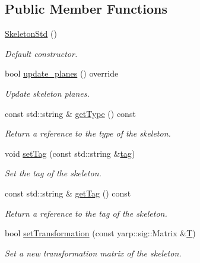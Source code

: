 \subsection*{Public Member Functions}
\begin{DoxyCompactItemize}
\item 
\mbox{\label{classassistive__rehab_1_1SkeletonStd_ae383ac2b515aa5774b010afc22856360}} 
\hyperlink{classassistive__rehab_1_1SkeletonStd_ae383ac2b515aa5774b010afc22856360}{Skeleton\+Std} ()
\begin{DoxyCompactList}\small\item\em Default constructor. \end{DoxyCompactList}\item 
bool \hyperlink{classassistive__rehab_1_1SkeletonStd_a5769bc6fd407118c866b57b869d672ca}{update\+\_\+planes} () override
\begin{DoxyCompactList}\small\item\em Update skeleton planes. \end{DoxyCompactList}\item 
const std\+::string \& \hyperlink{classassistive__rehab_1_1Skeleton_a4efc4844bd2b185f1080ee52ab69cb04}{get\+Type} () const
\begin{DoxyCompactList}\small\item\em Return a reference to the type of the skeleton. \end{DoxyCompactList}\item 
void \hyperlink{classassistive__rehab_1_1Skeleton_ae1c830e3d9a0ba692e5ae297caa52a82}{set\+Tag} (const std\+::string \&\hyperlink{classassistive__rehab_1_1Skeleton_a3d1ce5280300e012826948dc4383c2cb}{tag})
\begin{DoxyCompactList}\small\item\em Set the tag of the skeleton. \end{DoxyCompactList}\item 
const std\+::string \& \hyperlink{classassistive__rehab_1_1Skeleton_a185654045d5e43b3853cdb8fdd676da6}{get\+Tag} () const
\begin{DoxyCompactList}\small\item\em Return a reference to the tag of the skeleton. \end{DoxyCompactList}\item 
bool \hyperlink{classassistive__rehab_1_1Skeleton_a3486cbd7f59e75c1d9ef26cbc05bb72f}{set\+Transformation} (const yarp\+::sig\+::\+Matrix \&\hyperlink{classassistive__rehab_1_1Skeleton_a358a1c5eb23a562f8558ff8d43583ef7}{T})
\begin{DoxyCompactList}\small\item\em Set a new transformation matrix of the skeleton. \end{DoxyCompactList}\item 

\end{DoxyCompactItemize}
